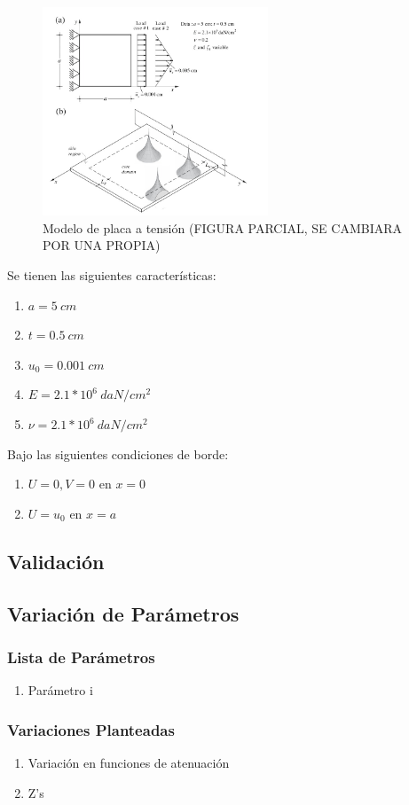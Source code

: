 \begin{enumerate}
		\begin{figure}
			\centering
			\sffamily
			\includegraphics[width=0.6\textwidth]{figuras/placa.jpeg}
			\caption{Modelo de placa a tensión (FIGURA PARCIAL, SE CAMBIARA POR UNA PROPIA)}
			\label{fig:placa_tension}
		\end{figure}

		Se tienen las siguientes características:
		\begin{enumerate}
			\item[] $a = 5\ cm$
			\item[] $t = 0.5\ cm$
			\item[] $u_0 = 0.001\ cm$
			\item[] $E = 2.1*10^6\ daN/cm^2$
			\item[] $\nu = 2.1*10^6\ daN/cm^2$
		\end{enumerate}

		Bajo las siguientes condiciones de borde:
		\begin{enumerate}
			\item[] $U = 0,V=0$ en $x=0$
			\item[] $U = u_0$ en $x=a$
		\end{enumerate}

	\end{enumerate}
	\subsection{Validación}
	\label{sub:validacion}

	\subsection{Variación de Parámetros}
	\label{sub:variacion}

		\subsubsection{Lista de Parámetros}
			\begin{enumerate}
				\item Parámetro i
			\end{enumerate}
		\subsubsection{Variaciones Planteadas}
			\begin{enumerate}
				\item Variación en funciones de atenuación
				\item Z's
			\end{enumerate}